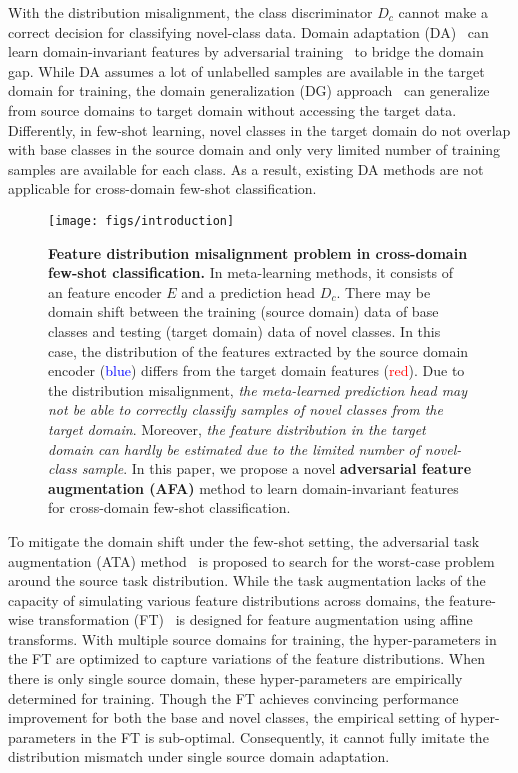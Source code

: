 \documentclass[runningheads]{utils/llncs}
\begin{document}
With the distribution misalignment, the class discriminator $D_c$ cannot make a correct decision for classifying novel-class data.
Domain adaptation (DA)~\cite{VolpiNSDMS18} can learn domain-invariant features by adversarial training~\cite{GaninUAGLLML17} to bridge the domain gap.
While DA assumes a lot of unlabelled samples are available in the target domain for training, the domain generalization (DG) approach~\cite{LiYZH19} can generalize from source domains to target domain without accessing the target data.
Differently, in few-shot learning, novel classes in the target domain do not overlap with base classes in the source domain and only very limited number of training samples are available for each class.
As a result, existing DA methods are not applicable for cross-domain few-shot classification.
\begin{figure}[t]
\begin{center}
\texttt{[image: figs/introduction]}
\caption{{\bf Feature distribution misalignment problem in cross-domain few-shot classification.} 
In meta-learning methods, it consists of an feature encoder $E$ and a prediction head $D_c$.
There may be domain shift between the training (source domain) data of base classes and testing (target domain) data of novel classes. 
In this case, the distribution of the features extracted by the source domain encoder (\textcolor{blue}{blue}) differs from the target domain features (\textcolor{red}{red}).
Due to the distribution misalignment, {\textit{the meta-learned prediction head may not be able to correctly classify samples of novel classes from the target domain}}. 
Moreover, \textit{the feature distribution in the target domain can hardly be estimated due to the limited number of novel-class sample}.
In this paper, we propose a novel \textbf{{adversarial feature augmentation (AFA)}} method to learn domain-invariant features for cross-domain few-shot classification.
}
\label{figure0}
\end{center}
\end{figure} 
To mitigate the domain shift under the few-shot setting, the adversarial task augmentation (ATA) method~\cite{WangD21} is proposed to search for the worst-case problem around the source task distribution.
While the task augmentation lacks of the capacity of simulating various feature distributions across domains, the feature-wise transformation (FT)~\cite{TsengLH020} is designed for feature augmentation using affine transforms.
With multiple source domains for training, the hyper-parameters in the FT are optimized to capture variations of the feature distributions.
When there is only single source domain, these hyper-parameters are empirically determined for training.
Though the FT achieves convincing performance improvement for both the base and novel classes, the empirical setting of hyper-parameters in the FT is sub-optimal.
Consequently, it cannot fully imitate the distribution mismatch under single source domain adaptation.
\end{document}

